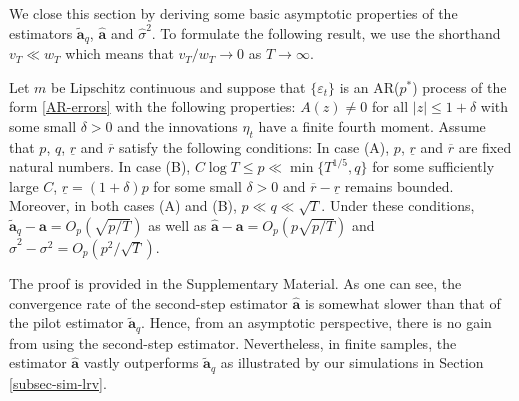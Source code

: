 We close this section by deriving some basic asymptotic properties of the estimators $\widetilde{\boldsymbol{a}}_q$, $\widehat{\boldsymbol{a}}$ and $\widehat{\sigma}^2$. To formulate the following result, we use the shorthand $v_T \ll w_T$ which means that $v_T/w_T \rightarrow 0$ as $T \rightarrow \infty$.  
\begin{prop}\label{prop-lrv}
Let $m$ be Lipschitz continuous and suppose that $\{\varepsilon_t\}$ is an AR($p^*$) process of the form \eqref{AR-errors} with the following properties: $A(z) \ne 0$ for all $|z| \le 1 + \delta$ with some small $\delta > 0$ and the innovations $\eta_t$ have a finite fourth moment. Assume that $p$, $q$, $\underline{r}$ and $\overline{r}$ satisfy the following conditions: In case (A), $p$, $\underline{r}$ and $\overline{r}$ are fixed natural numbers. In case (B), $C \log T \le p \ll \min\{ T^{1/5},q\}$ for some sufficiently large $C$, $\underline{r} = (1+\delta)p$ for some small $\delta > 0$ and $\overline{r} - \underline{r}$ remains bounded. Moreover, in both cases (A) and (B), $p \ll q \ll \sqrt{T}$. Under these conditions, $\widetilde{\boldsymbol{a}}_q - \boldsymbol{a} = O_p(\sqrt{p/T})$ as well as $\widehat{\boldsymbol{a}} - \boldsymbol{a} = O_p(p\sqrt{p/T})$ and $\widehat{\sigma}^2 - \sigma^2 = O_p(p^2/\sqrt{T})$.
\end{prop}
The proof is provided in the Supplementary Material. As one can see, the convergence rate of the second-step estimator $\widehat{\boldsymbol{a}}$ is somewhat slower than that of the pilot estimator $\widetilde{\boldsymbol{a}}_q$. Hence, from an asymptotic perspective, there is no gain from using the second-step estimator. Nevertheless, in finite samples, the estimator $\widehat{\boldsymbol{a}}$ vastly outperforms $\widetilde{\boldsymbol{a}}_q$ as illustrated by our simulations in Section \ref{subsec-sim-lrv}.


